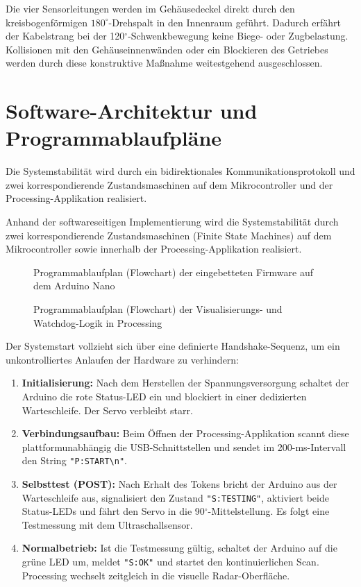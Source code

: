 Die vier Sensorleitungen werden im Gehäusedeckel direkt durch den kreisbogenförmigen $180^\circ$-Drehspalt in den Innenraum geführt. Dadurch erfährt der Kabelstrang bei der 120$^\circ$-Schwenkbewegung keine Biege- oder Zugbelastung. Kollisionen mit den Gehäuseinnenwänden oder ein Blockieren des Getriebes werden durch diese konstruktive Ma\ss nahme weitestgehend ausgeschlossen.

\section{Software-Architektur und Programmablaufpläne}
\label{sec:Software_Architektur_Protokoll}

Die Systemstabilität wird durch ein bidirektionales Kommunikationsprotokoll und zwei korrespondierende Zustandsmaschinen auf dem Mikrocontroller und der Processing-Applikation realisiert.

Anhand der softwareseitigen Implementierung wird die Systemstabilität durch zwei korrespondierende Zustandsmaschinen (Finite State Machines) auf dem Mikrocontroller sowie innerhalb der Processing-Applikation realisiert.

\begin{figure}[htbp]
	\centering
	
	\caption{Programmablaufplan (Flowchart) der eingebetteten Firmware auf dem Arduino Nano}
	\label{fig:Flowchart_Arduino}
\end{figure}

\begin{figure}[htbp]
	\centering
	
	\caption{Programmablaufplan (Flowchart) der Visualisierungs- und Watchdog-Logik in Processing}
	\label{fig:Flowchart_Processing}
\end{figure}

Der Systemstart vollzieht sich über eine definierte Handshake-Sequenz, um ein unkontrolliertes Anlaufen der Hardware zu verhindern:
\begin{enumerate}
	\item \textbf{Initialisierung:} Nach dem Herstellen der Spannungsversorgung schaltet der Arduino die rote Status-LED ein und blockiert in einer dedizierten Warteschleife. Der Servo verbleibt starr.
	\item \textbf{Verbindungsaufbau:} Beim Öffnen der Processing-Applikation scannt diese plattformunabhängig die USB-Schnittstellen und sendet im 200-ms-Intervall den String \texttt{"P:START\textbackslash n"}.
	\item \textbf{Selbsttest (POST):} Nach Erhalt des Tokens bricht der Arduino aus der Warteschleife aus, signalisiert den Zustand \texttt{"S:TESTING"}, aktiviert beide Status-LEDs und fährt den Servo in die 90$^\circ$-Mittelstellung. Es folgt eine Testmessung mit dem Ultraschallsensor.
	\item \textbf{Normalbetrieb:} Ist die Testmessung gültig, schaltet der Arduino auf die grüne LED um, meldet \texttt{"S:OK"} und startet den kontinuierlichen Scan. Processing wechselt zeitgleich in die visuelle Radar-Oberfläche.
\end{enumerate}

